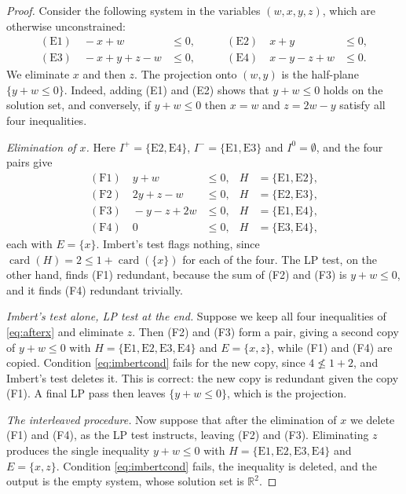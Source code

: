 \documentclass[11pt]{article}
\theoremstyle{definition}
\newcommand{\card}{\operatorname{card}}
\newcommand{\Ipos}{I^{+}}
\newcommand{\Ineg}{I^{-}}
\newcommand{\Izero}{I^{0}}
\begin{document}
\begin{proof}
Consider the following system in the variables $(w,x,y,z)$, which are otherwise unconstrained:
\begin{equation}
\begin{aligned}
(\mathrm{E}1)\quad -x+w &\le 0, &\qquad (\mathrm{E}2)\quad x+y &\le 0,\\
(\mathrm{E}3)\quad -x+y+z-w &\le 0, &\qquad (\mathrm{E}4)\quad x-y-z+w &\le 0.
\end{aligned}
\label{eq:counterexample}
\end{equation}
We eliminate $x$ and then $z$. The projection onto $(w,y)$ is the half-plane $\{y+w\le 0\}$. Indeed, adding (E1) and (E2) shows that $y+w\le 0$ holds on the solution set, and conversely, if $y+w\le 0$ then $x=w$ and $z=2w-y$ satisfy all four inequalities.

\emph{Elimination of $x$.} Here $\Ipos=\{\mathrm{E}2,\mathrm{E}4\}$, $\Ineg=\{\mathrm{E}1,\mathrm{E}3\}$ and $\Izero=\emptyset$, and the four pairs give
\begin{equation}
\begin{aligned}
(\mathrm{F}1)\quad y+w&\le 0, & H&=\{\mathrm{E}1,\mathrm{E}2\},\\
(\mathrm{F}2)\quad 2y+z-w&\le 0, & H&=\{\mathrm{E}2,\mathrm{E}3\},\\
(\mathrm{F}3)\quad -y-z+2w&\le 0, & H&=\{\mathrm{E}1,\mathrm{E}4\},\\
(\mathrm{F}4)\quad 0&\le 0, & H&=\{\mathrm{E}3,\mathrm{E}4\},
\end{aligned}
\label{eq:afterx}
\end{equation}
each with $E=\{x\}$. Imbert's test flags nothing, since $\card(H)=2\le 1+\card(\{x\})$ for each of the four. The LP test, on the other hand, finds (F1) redundant, because the sum of (F2) and (F3) is $y+w\le 0$, and it finds (F4) redundant trivially.

\emph{Imbert's test alone, LP test at the end.} Suppose we keep all four inequalities of \eqref{eq:afterx} and eliminate $z$. Then (F2) and (F3) form a pair, giving a second copy of $y+w\le 0$ with $H=\{\mathrm{E}1,\mathrm{E}2,\mathrm{E}3,\mathrm{E}4\}$ and $E=\{x,z\}$, while (F1) and (F4) are copied. Condition \eqref{eq:imbertcond} fails for the new copy, since $4\not\le 1+2$, and Imbert's test deletes it. This is correct: the new copy is redundant given the copy (F1). A final LP pass then leaves $\{y+w\le 0\}$, which is the projection.

\emph{The interleaved procedure.} Now suppose that after the elimination of $x$ we delete (F1) and (F4), as the LP test instructs, leaving (F2) and (F3). Eliminating $z$ produces the single inequality $y+w\le 0$ with $H=\{\mathrm{E}1,\mathrm{E}2,\mathrm{E}3,\mathrm{E}4\}$ and $E=\{x,z\}$. Condition \eqref{eq:imbertcond} fails, the inequality is deleted, and the output is the empty system, whose solution set is $\mathbb{R}^2$.
\end{proof}
\end{document}
